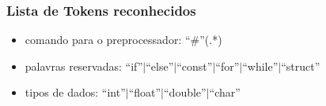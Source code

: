 \documentclass[12pt]{beamer}
\begin{document}
\begin{frame}[allowframebreaks]
    \frametitle{Lista de Tokens reconhecidos}
    \begin{itemize}
        \item comando para o preprocessador: ``\#''(.*)
        \item palavras reservadas: ``if''$|$``else''$|$``const''$|$``for''$|$``while''$|$``struct''
        \item tipos de dados: ``int''$|$``float''$|$``double''$|$``char''
    \end{itemize}
\end{frame}
\end{document}
